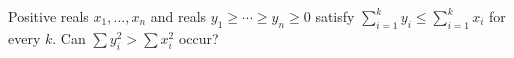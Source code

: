 Positive reals $x_1,\ldots,x_n$ and reals $y_1\ge\cdots\ge y_n\ge0$ satisfy $\sum_{i=1}^k y_i\le\sum_{i=1}^k x_i$ for every $k$. Can $\sum y_i^2>\sum x_i^2$ occur?
